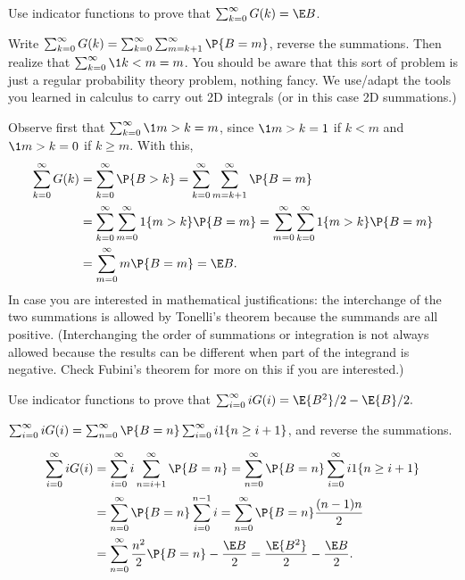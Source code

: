 \begin{exercise}\label{ex:6}
 Use indicator functions to prove that $ \sum_{k=0}^\infty G(k) = \E B$.
    \begin{hint}
Write 
$\sum_{k=0}^\infty G(k) = \sum_{k=0}^\infty \sum_{m=k+1}^\infty \P{B=m}$, reverse the summations. Then realize that $\sum_{k=0}^\infty \1{k<m} = m$. 
You should be aware that this sort of problem is just a regular probability
  theory problem, nothing fancy. We use/adapt the tools you learned in
  calculus to carry out 2D integrals (or in this case 2D summations.)
    \end{hint}
\begin{solution}
Observe first that $\sum_{k=0}^\infty \1{m>k} = m$, since $\1{m>k}=1$ if $k<m$ and $\1{m>k} = 0$ if $k\geq m$. With this, 
\begin{align*}
\sum_{k=0}^\infty G(k) 
&= \sum_{k=0}^\infty \P{B>k} 
= \sum_{k=0}^\infty \sum_{m=k+1}^\infty \P{B=m}  \\
& = \sum_{k=0}^\infty \sum_{m=0}^\infty 1\{m>k\} \P{B=m} 
= \sum_{m=0}^\infty \sum_{k=0}^\infty 1 \{m>k\} \P{B=m} \\
&= \sum_{m=0}^\infty m\P{B=m} = \E B.
\end{align*}
In case you are interested in mathematical justifications: the
interchange of the two summations is allowed by Tonelli's theorem because the summands are
all positive. (Interchanging the order of summations or integration is
not always allowed because the results can be different when part of
the integrand is negative. Check Fubini's theorem for more on this if
you are interested.)
\end{solution}
\end{exercise}

\begin{exercise}\label{ex:66}
 Use indicator functions to prove that
$\sum_{i=0}^\infty i G(i) =  \E{B^2}/2 - \E{B}/2.$
    \begin{hint}
$\sum_{i=0}^\infty i G(i) = \sum_{n=0}^\infty \P{B=n} \sum_{i=0}^\infty i 1\{n\geq i+1\}$,
and reverse the summations.
    \end{hint}
\begin{solution}
\begin{align*}
\sum_{i=0}^\infty i G(i)
&= \sum_{i=0}^\infty i \sum_{n=i+1}^\infty \P{B=n} = \sum_{n=0}^\infty \P{B=n} \sum_{i=0}^\infty i 1\{n\geq i+1\} \\
&= \sum_{n=0}^\infty \P{B=n} \sum_{i=0}^{n-1}i  = \sum_{n=0}^\infty \P{B=n} \frac{(n-1)n}{2} \\
&= \sum_{n=0}^\infty  \frac{n^2}{2} \P{B=n} - \frac{\E B}{2}
= \frac{\E{B^2}}{2} - \frac{\E B}{2}.
\end{align*}
\end{solution}
\end{exercise}


